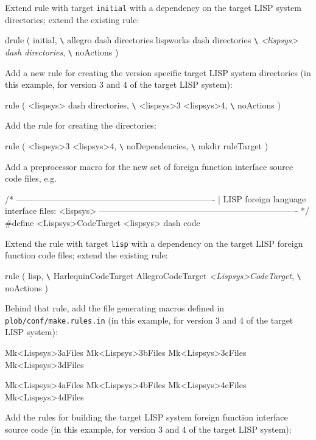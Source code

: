 Extend rule with target \texttt{initial} with a dependency on the
target LISP system directories; extend the existing rule:
\begin{CompactCode}
drule ( initial, \verb|\|
        allegro dash directories lispworks dash directories \verb|\|
        \emph{<lispsys> dash directories}, \verb|\|
        noActions )
\end{CompactCode}

Add a new rule for creating the version specific target LISP system
directories (in this example, for version 3 and 4 of the target LISP
system):
\begin{CompactCode}
rule ( <lispsys> dash directories, \verb|\|
       <lispsys>3 <lispsys>4, \verb|\|
       noActions )
\end{CompactCode}

Add the rule for creating the directories:
\begin{CompactCode}
rule ( <lispsys>3 <lispsys>4, \verb|\|
       noDependencies, \verb|\|
       mkdir ruleTarget )
\end{CompactCode}

Add a preprocessor macro for the new set of foreign function interface
source code files, e.g.
\begin{CompactCode}
/* ----------------------------------------------------------------------
| LISP foreign language interface files: <lispsys>
 ---------------------------------------------------------------------- */
#define	<Lispsys>CodeTarget <lispsys> dash code
\end{CompactCode}

Extend the rule with target \texttt{lisp} with a dependency on the
target LISP foreign function code files; extend the existing rule:
\begin{CompactCode}
rule ( lisp, \verb|\|
       HarlequinCodeTarget AllegroCodeTarget \emph{<Lispsys>CodeTarget}, \verb|\|
       noActions )
\end{CompactCode}

Behind that rule, add the file generating macros defined in
\texttt{plob/conf/make.rules.in} (in this example, for version 3 and 4
of the target LISP system):
\begin{CompactCode}
Mk<Lispsys>3aFiles
Mk<Lispsys>3bFiles
Mk<Lispsys>3cFiles
Mk<Lispsys>3dFiles

Mk<Lispsys>4aFiles
Mk<Lispsys>4bFiles
Mk<Lispsys>4cFiles
Mk<Lispsys>4dFiles
\end{CompactCode}

Add the rules for building the target LISP system foreign function
interface source code (in this example, for version 3 and 4 of the
target LISP system):

